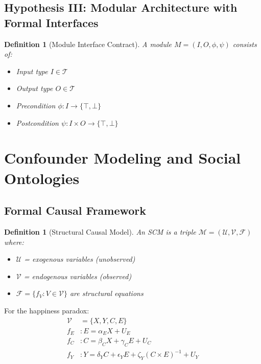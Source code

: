 \documentclass{article}
\newtheorem{definition}[theorem]{Definition}
\begin{document}
\subsection{Hypothesis III: Modular Architecture with Formal Interfaces}

\begin{definition}[Module Interface Contract]
A module $M = (I, O, \phi, \psi)$ consists of:
\begin{itemize}
\item Input type $I \in \mathcal{T}$
\item Output type $O \in \mathcal{T}$
\item Precondition $\phi: I \rightarrow \{\top, \bot\}$
\item Postcondition $\psi: I \times O \rightarrow \{\top, \bot\}$
\end{itemize}
\end{definition}

\section{Confounder Modeling and Social Ontologies}

\subsection{Formal Causal Framework}

\begin{definition}[Structural Causal Model]
An SCM is a triple $\mathcal{M} = (\mathcal{U}, \mathcal{V}, \mathcal{F})$ where:
\begin{itemize}
\item $\mathcal{U}$ = exogenous variables (unobserved)
\item $\mathcal{V}$ = endogenous variables (observed)
\item $\mathcal{F} = \{f_V : V \in \mathcal{V}\}$ are structural equations
\end{itemize}
\end{definition}

For the happiness paradox:
\begin{align}
\mathcal{V} &= \{X, Y, C, E\} \\
f_E &: E = \alpha_E X + U_E \\
f_C &: C = \beta_C X + \gamma_C E + U_C \\
f_Y &: Y = \delta_Y C + \epsilon_Y E + \zeta_Y (C \times E)^{-1} + U_Y
\end{align}
\end{document}
